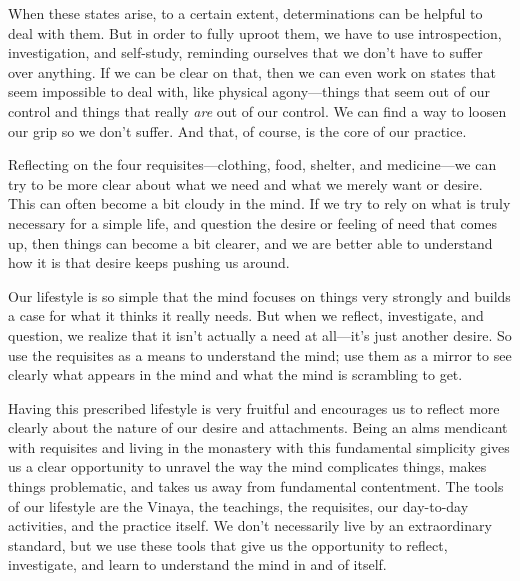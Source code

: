 When these states arise, to a certain extent, determinations can be 
helpful to deal with them. But in order to fully uproot them, we have 
to use introspection, investigation, and self-study, reminding 
ourselves that we don't have to suffer over anything. If we can be 
clear on that, then we can even work on states that seem impossible to 
deal with, like physical agony---things that seem out of our control 
and things that really \emph{are} out of our control. We can find a way 
to loosen our grip so we don't suffer. And that, of course, is the core 
of our practice.


Reflecting on the four requisites---clothing, food, shelter, and 
medicine---we can try to be more clear about what we need and what we 
merely want or desire. This can often become a bit cloudy in the mind. 
If we try to rely on what is truly necessary for a simple life, and 
question the desire or feeling of need that comes up, then things can 
become a bit clearer, and we are better able to understand how it is 
that desire keeps pushing us around.

Our lifestyle is so simple that the mind focuses on things very 
strongly and builds a case for what it thinks it really needs. But when 
we reflect, investigate, and question, we realize that it isn't 
actually a need at all---it's just another desire. So use the 
requisites as a means to understand the mind; use them as a mirror to 
see clearly what appears in the mind and what the mind is scrambling to 
get.

Having this prescribed lifestyle is very fruitful and encourages us to 
reflect more clearly about the nature of our desire and attachments. 
Being an alms mendicant with requisites and living in the monastery 
with this fundamental simplicity gives us a clear opportunity to 
unravel the way the mind complicates things, makes things problematic, 
and takes us away from fundamental contentment. The tools of our 
lifestyle are the Vinaya, the teachings, the requisites, our day-to-day 
activities, and the practice itself. We don't necessarily live by an 
extraordinary standard, but we use these tools that give us the 
opportunity to reflect, investigate, and learn to understand the mind 
in and of itself.


